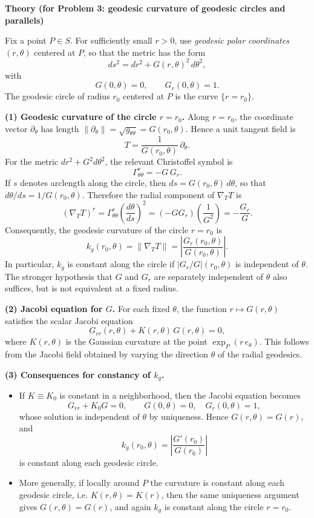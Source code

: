 \begin{solution}
\par\medskip\noindent\textbf{Theory (for Problem 3: geodesic curvature of geodesic circles and parallels)}\par\smallskip


Fix a point \(P\in S\). For sufficiently small \(r>0\), use \emph{geodesic polar coordinates}
\((r,\theta)\) centered at \(P\), so that the metric has the form
\[
ds^{2}=dr^{2}+G(r,\theta)^{2}\,d\theta^{2},
\]
with
\[
G(0,\theta)=0,\qquad G_{r}(0,\theta)=1.
\]
The geodesic circle of radius \(r_{0}\) centered at \(P\) is the curve \(\{r=r_{0}\}\).

\medskip
\noindent\textbf{(1) Geodesic curvature of the circle \(r=r_{0}\).}
Along \(r=r_{0}\), the coordinate vector \(\partial_{\theta}\) has length
\(\|\partial_{\theta}\|=\sqrt{g_{\theta\theta}}=G(r_{0},\theta)\). Hence a unit tangent field is
\[
T=\frac{1}{G(r_{0},\theta)}\,\partial_{\theta}.
\]
For the metric \(dr^{2}+G^{2}d\theta^{2}\), the relevant Christoffel symbol is
\[
\Gamma^{r}_{\theta\theta}=-G\,G_{r}.
\]
If \(s\) denotes arclength along the circle, then \(ds=G(r_{0},\theta)\,d\theta\), so that
\(d\theta/ds=1/G(r_{0},\theta)\). Therefore the radial component of \(\nabla_{T}T\) is
\[
(\nabla_{T}T)^{r}=\Gamma^{r}_{\theta\theta}\left(\frac{d\theta}{ds}\right)^{2}
=(-GG_{r})\left(\frac{1}{G^{2}}\right)=-\frac{G_{r}}{G}.
\]
Consequently, the geodesic curvature of the circle \(r=r_{0}\) is
\[
k_{g}(r_{0},\theta)=\|\nabla_{T}T\|=\left|\frac{G_{r}(r_{0},\theta)}{G(r_{0},\theta)}\right|.
\]
In particular, \(k_{g}\) is constant along the circle if
\(\lvert G_{r}/G\rvert(r_{0},\theta)\) is independent of \(\theta\).
The stronger hypothesis that \(G\) and \(G_r\) are separately independent
of \(\theta\) also suffices, but is not equivalent at a fixed radius.

\medskip
\noindent\textbf{(2) Jacobi equation for \(G\).}
For each fixed \(\theta\), the function \(r\mapsto G(r,\theta)\) satisfies the scalar Jacobi equation
\[
G_{rr}(r,\theta)+K(r,\theta)\,G(r,\theta)=0,
\]
where \(K(r,\theta)\) is the Gaussian curvature at the point \(\exp_{P}(r\,e_{\theta})\).
This follows from the Jacobi field obtained by varying the direction \(\theta\) of the radial geodesics.

\medskip
\noindent\textbf{(3) Consequences for constancy of \(k_g\).}
\begin{itemize}
	\item If \(K\equiv K_{0}\) is constant in a neighborhood, then the Jacobi equation becomes
	\[
	G_{rr}+K_{0}G=0,\qquad G(0,\theta)=0,\quad G_{r}(0,\theta)=1,
	\]
	whose solution is independent of \(\theta\) by uniqueness. Hence \(G(r,\theta)=G(r)\), and
	\[
	k_{g}(r_{0},\theta)=\left|\frac{G'(r_{0})}{G(r_{0})}\right|
	\]
	is constant along each geodesic circle.
	\item More generally, if locally around \(P\) the curvature is constant along each geodesic circle,
	i.e. \(K(r,\theta)=K(r)\), then the same uniqueness argument gives \(G(r,\theta)=G(r)\), and again
	\(k_{g}\) is constant along the circle \(r=r_{0}\).
\end{itemize}


\end{solution}
